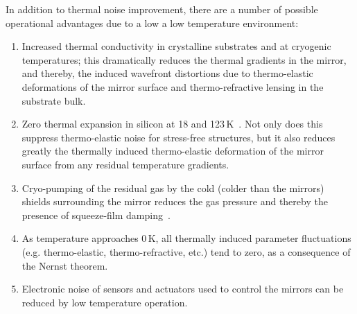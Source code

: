 In addition to thermal noise improvement, there are a number of possible operational advantages due to a low a low temperature environment:
\begin{enumerate}
\item Increased thermal conductivity in crystalline substrates and at cryogenic temperatures; this dramatically reduces the thermal gradients in the mirror, and thereby, the induced wavefront distortions due to thermo-elastic deformations of the mirror surface and thermo-refractive lensing in the substrate bulk.
\item Zero thermal expansion in silicon at 18 and 123\,K~\cite{Touloukian_Brett6,Wiens:14}. Not only does this suppress thermo-elastic noise for stress-free structures, but it also reduces greatly the thermally induced thermo-elastic deformation of the mirror surface from any residual temperature gradients.
\item Cryo-pumping of the residual gas by the cold (colder than the mirrors) shields surrounding the mirror reduces the gas pressure and thereby the presence of squeeze-film damping~\cite{Cavalleri:09,Bao:07}.
\item As temperature approaches 0\,K, all thermally induced parameter fluctuations (e.g. thermo-elastic, thermo-refractive, etc.) tend to zero, as a consequence of the Nernst theorem.
\item Electronic noise of sensors and actuators used to control the mirrors can be reduced by low temperature operation.
\end{enumerate}
 


